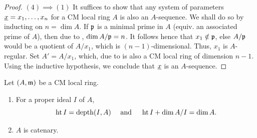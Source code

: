 \begin{proof}
    $(4)\implies(1)$ It suffices to show that any system of parameters $\underline{x} = x_1,\dots,x_n$ for a CM local ring $A$ is also an $A$-sequence. We shall do so by inducting on $n = \dim A$. If $\mathfrak{p}$ is a minimal prime in $A$ (equiv. an associated prime of $A$), then due to , $\dim A/\mathfrak{p} = n$. It follows hence that $x_1\notin\mathfrak{p}$, else $A/\mathfrak{p}$ would be a quotient of $A/x_1$, which is $(n - 1)$-dimensional. Thus, $x_1$ is $A$-regular. Set $A' = A/x_1$, which, due to  is also a CM local ring of dimension $n - 1$. Using the inductive hypothesis, we conclude that $\underline{x}$ is an $A$-sequence.
\end{proof}

\begin{theorem}
    Let $(A,\mathfrak{m})$ be a CM local ring. 
    \begin{enumerate}[label=(\arabic*)]
        \item For a proper ideal $I$ of $A$, 
        \begin{equation*}
            \operatorname{ht} I = \operatorname{depth}(I, A)\quad\text{ and }\quad \operatorname{ht} I + \dim A/I = \dim A. 
        \end{equation*}
        \item $A$ is catenary.  
    \end{enumerate}
\end{theorem}
